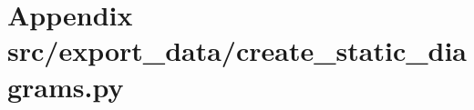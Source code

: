 \section{Appendix \/src/export\_data/create\_static\_diagrams.py}\label{app:create_static_diagrams.py}
